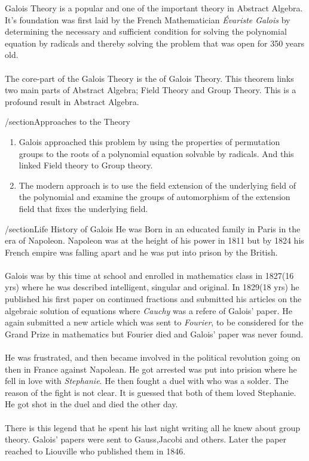 Galois Theory is a popular and one of the important theory in Abstract Algebra. It's
foundation was first laid by the French Mathematician \textit{Évariste Galois} by determining
the necessary and sufficient condition for solving the polynomial equation by radicals and
thereby solving the problem that was open for 350 years old.\\ \\
The core-part of the Galois Theory is the  of Galois Theory. This theorem links
two main parts of Abstract Algebra; Field Theory and Group Theory. This is a profound result in Abstract
Algebra. 

/section{Approaches to the Theory}
\begin{enumerate}
\item Galois approached this problem by using the properties of permutation groups to the roots of a
polynomial equation solvable by radicals. And this linked Field theory to Group theory.
\item The modern approach is to use the field extension of the underlying field of the polynomial and 
examine the groups of automorphism of the extension field that fixes the underlying field. 
\end{enumerate}

/section{Life History of Galois}
He was Born in an educated family in Paris in the era of Napoleon. Napoleon was at the height of his
power in 1811 but by 1824 his French empire was falling apart and he was put into prison by the British.\\ \\
Galois was by this time at school and enrolled in mathematics class in 1827(16 yrs) where
he was described intelligent, singular and original. In 1829(18 yrs) he published his first paper on 
continued fractions and submitted his articles on the algebraic solution of equations where 
\textit{Cauchy} was a refere of Galois’ paper. He again submitted a new article which was sent to 
\textit{Fourier}, to be considered for the Grand Prize in mathematics but Fourier died and 
Galois’ paper was never found.\\ \\

He was frustrated, and then became involved in the political revolution going on then in France against Napolean.
He got arrested was put into prision where he fell in love with \textit{Stephanie}. He then fought a duel with
 who was a solder. The reason of the fight is not clear. It is guessed that both of them loved
Stephanie. He got shot in the duel and died the other day.\\ \\
There is this legend that he spent his last night writing all he knew about group theory. Galois’ papers 
were sent to Gauss,Jacobi and others. Later the paper reached to Liouville who published them in 1846.
